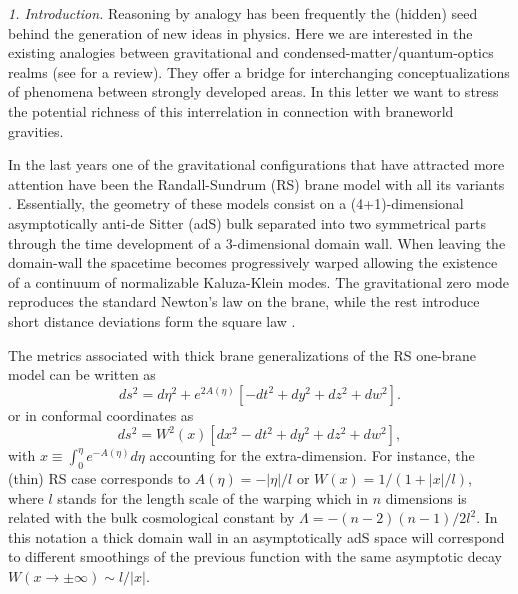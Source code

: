 \documentclass[a4paper,prl,showpacs,twocolumn]{revtex4}
\begin{document}
\def\half{{1\over 2}}
\def\L{{\mathcal L}}
\def\S{{\mathcal S}}
\def\d{{\mathrm{d}}}
\def\x{{\mathbf x}}
\def\v{{\mathbf v}}
\def\im{{\rm i}}
\def\etal{{\emph{et al\/}}}
\def\det{{\mathrm{det}}}
\def\tr{{\mathrm{tr}}}
\def\ie{{\emph{i.e.}}}
\def\bnabla{\mbox{\boldmath$\nabla$}}
\def\Box{\kern0.5pt{\lower0.1pt\vbox{\hrule height.5pt width 6.8pt
    \hbox{\vrule width.5pt height6pt \kern6pt \vrule width.3pt}
    \hrule height.3pt width 6.8pt} }\kern1.5pt}
\def\HRULE{{\bigskip\hrule\bigskip}}

\noindent
{\it 1. Introduction.}
Reasoning by analogy has been frequently the (hidden) seed 
behind the generation of new ideas in physics. 
Here we are interested in the existing 
analogies between gravitational and condensed-matter/quantum-optics realms
(see \cite{Workshop} for a review). They offer a bridge for interchanging 
conceptualizations of phenomena between strongly developed 
areas. In this letter we want to stress the potential
richness of this interrelation in connection with braneworld
gravities. 


In the last years one of the gravitational configurations
that have attracted more attention have been the Randall-Sundrum (RS)
brane model with all its variants \cite{RS1,RS2}.
Essentially, the geometry of these models consist on a (4+1)-dimensional
asymptotically anti-de Sitter (adS) bulk separated into two symmetrical
parts through the time development of a 3-dimensional domain wall.
When leaving the domain-wall the spacetime becomes progressively warped
allowing the existence of a continuum of normalizable Kaluza-Klein
modes. The gravitational zero mode reproduces the standard Newton's law
on the brane, while the rest introduce short distance deviations
form the square law \cite{RS2,garriga}.

The metrics associated with thick brane generalizations of the 
RS one-brane model \cite{RS2} can be written as   
%
\begin{equation}
ds^2 = d\eta^2 +e^{2A(\eta)}[-dt^2+dy^2+dz^2+dw^2].
\end{equation}
%
or in conformal coordinates as
%
\begin{equation}
ds^2 = W^2(x)[dx^2-dt^2+dy^2+dz^2+dw^2],
\label{conformal-metric}
\end{equation}
%
with $x\equiv\int_0^{\eta} e^{-A(\eta)}d\eta$ 
accounting for the extra-dimension.
For instance, the (thin) RS case corresponds to
$A(\eta)=-|\eta|/l$ or $W(x)=1/(1+|x|/l)$, where $l$ stands for
the length scale of the warping which in $n$ dimensions is related 
with the bulk cosmological
constant by $\Lambda=-(n-2)(n-1)/2 l^2$. 
In this notation a thick domain wall in an asymptotically adS
space will correspond to different smoothings of the previous function
with the same asymptotic decay 
$W(x\rightarrow \pm\infty)\sim l/|x|$.
\end{document}
